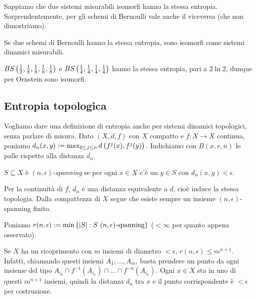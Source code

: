 Sappiamo che due sistemi misurabili isomorfi hanno la stessa entropia. Sorprendentemente, per gli schemi di Bernoulli vale anche il viceversa
(che non dimostriamo):

\begin{teo}[Ornstein]Se due schemi di Bernoulli hanno la stessa entropia, sono isomorfi come sistemi dinamici misurabili.
\end{teo}

\begin{esempio}$BS\left(\frac{1}{2},\frac{1}{8},\frac{1}{8},\frac{1}{8},\frac{1}{8}\right)$ e $BS\left(\frac{1}{4},\frac{1}{4},\frac{1}{4},\frac{1}{4}\right)$
hanno la stessa entropia, pari a $2\ln 2$, dunque per Ornstein sono isomorfi.
\end{esempio}

\subsection{Entropia topologica}

Vogliamo dare una definizione di entropia anche per sistemi dinamici topologici, senza parlare di misura.
Dato $(X,d,f)$ con $X$ compatto e $f:X\to X$ continua, poniamo $d_n(x,y):=\max_{0\le j\le n}d\left(f^j(x),f^j(y)\right)$.
Indichiamo con $B(x,r,n)$ le palle rispetto alla distanza $d_n$.

\begin{defi}$S\subseteq X$ è $(n,\epsilon)$-\emph{spanning} se per ogni $x\in X$ c'è un $y\in S$
con $d_n(x,y)<\epsilon$.
\end{defi}

\begin{oss}Per la continuità di $f$, $d_n$ è una distanza equivalente a $d$, cioè
induce la stessa topologia. Dalla compattezza di $X$ segue che esiste sempre un insieme $(n,\epsilon)$-spanning finito.
\end{oss}

\begin{defi}Poniamo $r(n,\epsilon):=\min\set{\abs{S}:S\ (n,\epsilon)\text{-spanning}}$ ($<\infty$
per quanto appena osservato).
\end{defi}

\begin{oss}Se $X$ ha un ricoprimento con $m$ insiemi di diametro $<\epsilon$, $r(n,\epsilon)\le m^{n+1}$.
Infatti, chiamando questi insiemi $A_1,\dots,A_m$, basta prendere un punto da ogni insieme del tipo
$A_{i_0}\cap f^{-1}(A_{i_1})\cap\dots\cap f^{-n}(A_{i_n})$. Ogni $x\in X$ sta in uno di questi $m^{n+1}$ insiemi,
quindi la distanza $d_n$ tra $x$ e il punto corrispondente è $<\epsilon$ per costruzione.
\end{oss}


